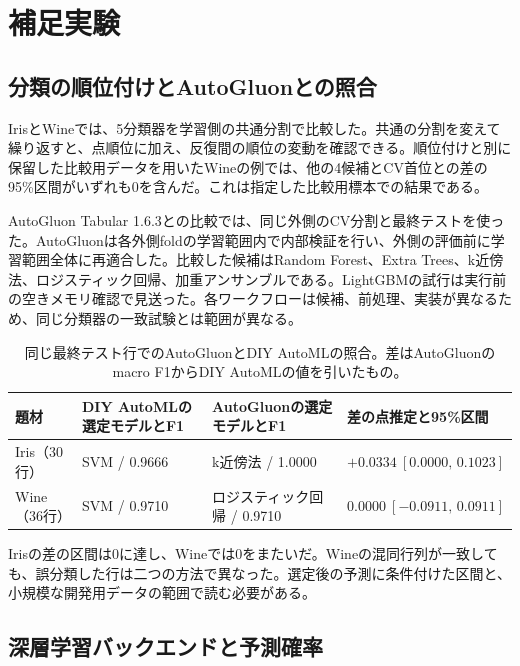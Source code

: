 \section{補足実験}\label{sec:additional}

\subsection{分類の順位付けとAutoGluonとの照合}

IrisとWineでは、5分類器を学習側の共通分割で比較した。共通の分割を変えて繰り返すと、点順位に加え、反復間の順位の変動を確認できる。順位付けと別に保留した比較用データを用いたWineの例では、他の4候補とCV首位との差の95\%区間がいずれも0を含んだ。これは指定した比較用標本での結果である\cite{ranking,worklog}。

AutoGluon Tabular 1.6.3との比較では、同じ外側のCV分割と最終テストを使った。AutoGluonは各外側foldの学習範囲内で内部検証を行い、外側の評価前に学習範囲全体に再適合した。比較した候補はRandom Forest、Extra Trees、k近傍法、ロジスティック回帰、加重アンサンブルである。LightGBMの試行は実行前の空きメモリ確認で見送った。各ワークフローは候補、前処理、実装が異なるため、同じ分類器の一致試験とは範囲が異なる\cite{agcheck}。

\begin{table}[htbp]
\centering
\small
\caption{同じ最終テスト行でのAutoGluonとDIY AutoMLの照合。差はAutoGluonのmacro F1からDIY AutoMLの値を引いたもの。}
\label{tab:autogluon}
\begin{tabularx}{\linewidth}{@{}p{24mm}YYl@{}}
\toprule
題材 & DIY AutoMLの選定モデルとF1 & AutoGluonの選定モデルとF1 & 差の点推定と95\%区間 \\
\midrule
Iris（30行） & SVM / 0.9666 & k近傍法 / 1.0000 & $+0.0334\ [0.0000,\,0.1023]$ \\
Wine（36行） & SVM / 0.9710 & ロジスティック回帰 / 0.9710 & $0.0000\ [-0.0911,\,0.0911]$ \\
\bottomrule
\end{tabularx}
\end{table}

Irisの差の区間は0に達し、Wineでは0をまたいだ。Wineの混同行列が一致しても、誤分類した行は二つの方法で異なった。選定後の予測に条件付けた区間と、小規模な開発用データの範囲で読む必要がある。

\subsection{深層学習バックエンドと予測確率}

